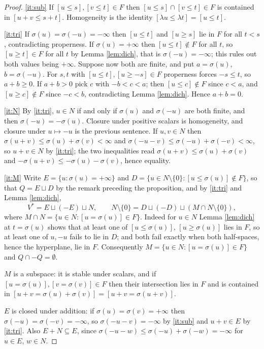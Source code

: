 \documentclass[11pt]{amsart}
\theoremstyle{plain}
\theoremstyle{definition}
\newcommand{\Vs}{V^{*}}
\begin{document}
\begin{proof}
\eqref{it:sub} If $[u\le s],[v\le t]\in F$ then $[u\le s]\cap[v\le t]\in F$ is contained in $[u+v\le s+t]$. Homogeneity is the identity $[\lambda u\le\lambda t]=[u\le t]$.

\eqref{it:tri} If $\sigma(u)=\sigma(-u)=-\infty$ then $[u\le t]$ and $[u\ge s]$ lie in $F$ for all $t<s$, contradicting properness. If $\sigma(u)=+\infty$ then $[u\le t]\notin F$ for all $t$, so $[u\ge t]\in F$ for all $t$ by Lemma \ref{lem:dich}, that is $\sigma(-u)=-\infty$; this rules out both values being $+\infty$. Suppose now both are finite, and put $a=\sigma(u)$, $b=\sigma(-u)$. For $s,t$ with $[u\le t],[u\ge -s]\in F$ properness forces $-s\le t$, so $a+b\ge0$. If $a+b>0$ pick $c$ with $-b<c<a$; then $[u\le c]\notin F$ since $c<a$, and $[u\ge c]\notin F$ since $-c<b$, contradicting Lemma \ref{lem:dich}. Hence $a+b=0$.

\eqref{it:N} By \eqref{it:tri}, $u\in N$ if and only if $\sigma(u)$ and $\sigma(-u)$ are both finite, and then $\sigma(-u)=-\sigma(u)$. Closure under positive scalars is homogeneity, and closure under $u\mapsto-u$ is the previous sentence. If $u,v\in N$ then $\sigma(u+v)\le\sigma(u)+\sigma(v)<\infty$ and $\sigma(-u-v)\le\sigma(-u)+\sigma(-v)<\infty$, so $u+v\in N$ by \eqref{it:tri}; the two inequalities read $\sigma(u+v)\le\sigma(u)+\sigma(v)$ and $-\sigma(u+v)\le-\sigma(u)-\sigma(v)$, hence equality.

\eqref{it:M} Write $E=\{u:\sigma(u)=+\infty\}$ and $D=\{u\in N\setminus\{0\}:[u\le\sigma(u)]\notin F\}$, so that $Q=E\sqcup D$ by the remark preceding the proposition, and by \eqref{it:tri} and Lemma \ref{lem:dich},
\[
\Vs=E\sqcup(-E)\sqcup N,\qquad N\setminus\{0\}=D\sqcup(-D)\sqcup(M\cap N\setminus\{0\}),
\]
where $M\cap N=\{u\in N:[u=\sigma(u)]\in F\}$. Indeed for $u\in N$ Lemma \ref{lem:dich} at $t=\sigma(u)$ shows that at least one of $[u\le\sigma(u)]$, $[u\ge\sigma(u)]$ lies in $F$, so at least one of $u,-u$ fails to lie in $D$; and both fail exactly when both half-spaces, hence the hyperplane, lie in $F$. Consequently $M=\{u\in N:[u=\sigma(u)]\in F\}$ and $Q\cap-Q=\emptyset$.

$M$ is a subspace: it is stable under scalars, and if $[u=\sigma(u)],[v=\sigma(v)]\in F$ then their intersection lies in $F$ and is contained in $[u+v=\sigma(u)+\sigma(v)]=[u+v=\sigma(u+v)]$.

$E$ is closed under addition: if $\sigma(u)=\sigma(v)=+\infty$ then $\sigma(-u)=\sigma(-v)=-\infty$, so $\sigma(-u-v)=-\infty$ by \eqref{it:sub} and $u+v\in E$ by \eqref{it:tri}. Also $E+N\subseteq E$, since $\sigma(-u-w)\le\sigma(-u)+\sigma(-w)=-\infty$ for $u\in E$, $w\in N$.


\end{proof}
\end{document}
